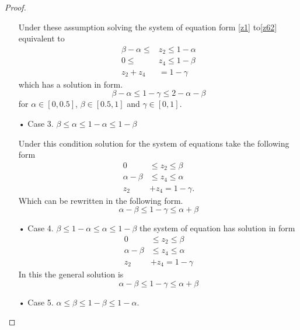 \begin{proof}
\begin{itemize}
Under these assumption solving the system of equation form  \ref{z1} to\ref{z62} equivalent to 
\begin{align*}
\beta-\alpha \leq &z_2 \leq 1-\alpha\\
0 \leq &z_4 \leq 1-\beta\\
z_2+z_4&=1-\gamma
\end{align*}
which has a solution in form.
\begin{equation}\label{zc2}
\beta-\alpha \leq1-\gamma \leq 2-\alpha-\beta
\end{equation}
for $\alpha \in [0,0.5]$, $\beta\in [0.5,1]$ and $\gamma \in [0,1]$.
\item[• Case 3.] $\beta \leq \alpha \leq 1-\alpha \leq 1-\beta$

Under this condition solution for the system of equations take the following form
\begin{align*}
0&\leq z_2\leq \beta\\
\alpha-\beta&\leq z_4\leq \alpha\\
z_2&+z_4=1-\gamma.
\end{align*}
Which can be rewritten in the following form.
\begin{equation}\label{zc3}
\alpha-\beta \leq 1-\gamma \leq \alpha+\beta
\end{equation}
\item[• Case 4.] $\beta \leq 1-\alpha \leq \alpha \leq 1- \beta$
the system of equation has solution in form
\begin{align*}
0&\leq z_2 \leq\beta\\
\alpha-\beta&\leq z_4\leq \alpha\\
z_2&+z_4=1-\gamma
\end{align*}
In this the general solution is
\begin{equation}\label{zc4}
\alpha-\beta \leq 1-\gamma \leq \alpha+\beta
\end{equation}
\item[• Case 5.] $\alpha\leq \beta \leq 1-\beta \leq 1-\alpha$.


\end{itemize}
\end{proof}
